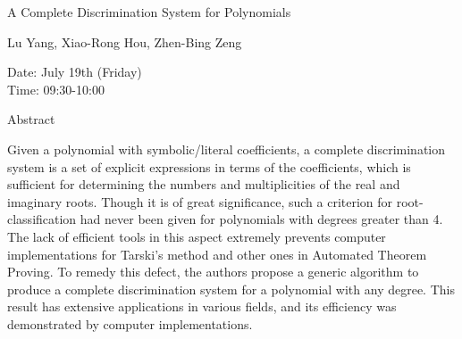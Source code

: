 \begin{center}
\LARGE
A Complete Discrimination System for Polynomials

\end{center}

\begin{center}
\Large
Lu Yang, Xiao-Rong Hou, Zhen-Bing Zeng

\end{center}

\noindent
Date:  July 19th (Friday)\\
Time: 09:30-10:00\\

\begin{center}
\large
Abstract
\end{center}

Given a polynomial with symbolic/literal coefficients, a complete discrimination system is a set of
explicit expressions in terms of the coefficients, which is sufficient for determining the numbers
and multiplicities of the real and imaginary roots. Though it is of great significance, such a
criterion for root-classification had never been given for polynomials with degrees greater than 4.
The lack of efficient tools in this aspect extremely prevents computer implementations for
Tarski's method and other ones in Automated Theorem Proving. To remedy this defect, the authors
propose a generic algorithm to produce a complete discrimination system for a polynomial with
any degree. This result has extensive applications in various fields, and its efficiency was
demonstrated by computer implementations. 

